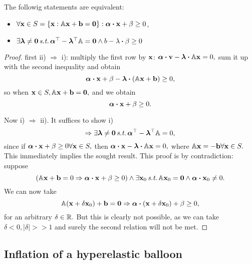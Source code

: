 \documentclass[11pt]{scrartcl} %
\begin{document}
\begin{theorem}
    The followig statements are equivalent:

    \begin{itemize}
	    \item $\forall \vb{x} \in S = \qty{\vb{x}: \tensorq{A}\vb{x}+\vb{b} = \vb{0}}: \vb*{\alpha} \vdot \vb{x} + \beta \geq 0$,
	    \item $\exists \vb*{\lambda} \neq \vb{0} \, \text{\textit{s.t.}} \, \transpose{\vb*{\alpha}} - \transpose{\vb*{\lambda}} \tensorq{A} = \vb{0} \wedge b - \lambda \vdot \beta \geq 0$
    \end{itemize}
\end{theorem}
\begin{proof}
	first ii) $\Rightarrow$ i): multiply the first row by $\vb{x}$: $\vb*{\alpha} \vdot \vb{v} - \vb*{\lambda} \vdot \tensorq{A} \vb{x} = 0,$ sum it up with the second inequality and obtain
	\[
		\vb*{\alpha} \vdot \vb{x} + \beta - \vb*{\lambda} \vdot \qty(\tensorq{A} \vb{x}+\vb{b}) \geq 0,
	\]
	so when $\vb{x} \in S, \mathbb{A}\vb{x} + \vb{b} = \vb{0},$ and we obtain
	\[
		\vb*{\alpha} \vdot \vb{x} + \beta \geq 0.
	\]

	Now i) $\Rightarrow$ ii). It suffices to show i)
	\[
		\Rightarrow \exists \vb*{\lambda} \neq \vb{0} \, \text{\textit{s.t.}} \, \vb*{\alpha}^\top - \vb*{\lambda}^\top\mathbb{A} =0,
	\]
	since if $\vb*{\alpha} \vdot \vb{x} + \beta \geq 0 \forall \vb{x}\in S, $ then $\vb*{\alpha} \vdot \vb{x} - \vb*{\lambda} \vdot \tensorq{A}\vb{x} = 0, $  where $\mathbb{A} \vb{x} = - \vb{b} \forall \vb{x} \in S.$ This immediately implies the sought result.
	This proof is by contradiction: suppose
	\[
		\qty(\tensorq{A}\vb{x} + \vb{b} = 0 \Rightarrow \vb*{\alpha} \vdot \vb{x} + \beta \geq 0) \wedge \exists \vb{x}_0 \, \text{\textit{s.t.}} \, \tensorq{A}\vb{x}_0 = \vb{0} \wedge \vb*{\alpha} \vdot \vb{x}_0 \neq 0.
	\]
	We can now take
	\[
		\tensorq{A}\qty(\vb{x} + \delta \vb{x}_0) + \vb{b} = \vb{0} \Rightarrow \vb*{\alpha} \vdot \qty(\vb{x} + \delta \vb{x}_0) + \beta \geq 0,
	\]
	for an arbitrary $\delta \in {\mathbb R}.$ But this is clearly not possible, as we can take $\delta < 0, |\delta| >> 1$ and surely the second relation will not be met.
\end{proof}

\subsection{Inflation of a hyperelastic balloon}
\label{sec:inflation}
\end{document}
